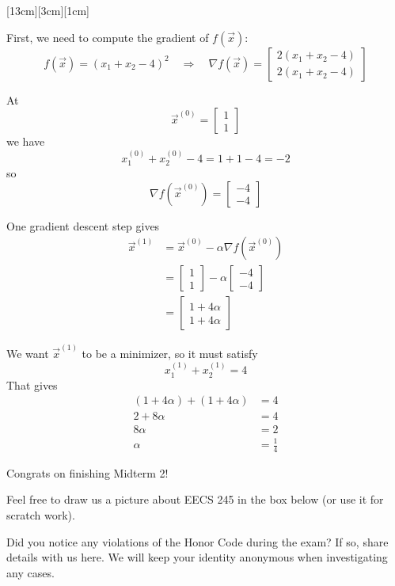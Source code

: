 \documentclass[11pt]{article}
\begin{document}
\begin{prob}[(11 pts)]
\begin{subprob}
[13cm][3cm][1cm]

\begin{solution}
First, we need to compute the gradient of $f(\vec x)$:
\[
f(\vec x) = (x_1 + x_2 - 4)^2
\quad \Longrightarrow \quad
\nabla f(\vec x) = \begin{bmatrix}
2(x_1 + x_2 - 4) \\
2(x_1 + x_2 - 4)
\end{bmatrix}
\]

At
\[
\vec x^{(0)} = \begin{bmatrix} 1 \\ 1 \end{bmatrix}
\]
we have
\[
x_1^{(0)} + x_2^{(0)} - 4 = 1 + 1 - 4 = -2
\]
so
\[
\nabla f(\vec x^{(0)}) = \begin{bmatrix} -4 \\ -4 \end{bmatrix}
\]

One gradient descent step gives
\begin{align*}
\vec x^{(1)} &= \vec x^{(0)} - \alpha \nabla f(\vec x^{(0)}) \\
&= \begin{bmatrix} 1 \\ 1 \end{bmatrix} - \alpha \begin{bmatrix} -4 \\ -4 \end{bmatrix} \\
&= \begin{bmatrix} 1 + 4\alpha \\ 1 + 4\alpha \end{bmatrix}
\end{align*}

We want $\vec x^{(1)}$ to be a minimizer, so it must satisfy
\[
x_1^{(1)} + x_2^{(1)} = 4
\]
That gives
\begin{align*}
(1 + 4\alpha) + (1 + 4\alpha) &= 4 \\
2 + 8\alpha &= 4 \\
8\alpha &= 2 \\
\alpha &= \frac{1}{4}
\end{align*}
\end{solution}

\end{subprob}

\end{prob}

\newpage

Congrats on finishing Midterm 2!

Feel free to draw us a picture about EECS 245 in the box below (or use it for scratch work).

\emptybox{15cm}

Did you notice any violations of the Honor Code during the exam? If so, share details with us here. We will keep your identity anonymous when investigating any cases.

\emptybox{3cm}
\end{document}
